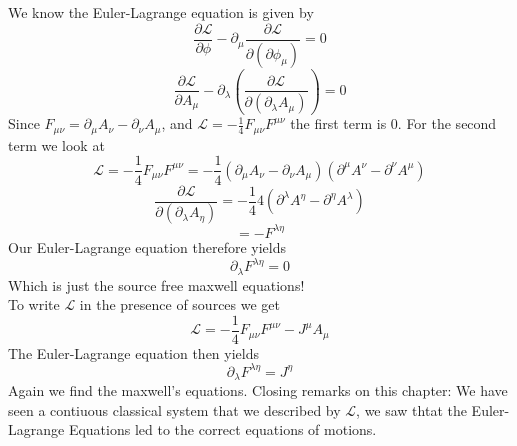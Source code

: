 \documentclass{report}
\begin{document}
We know the Euler-Lagrange equation is given by \[
	\frac{\partial \mathcal{L}}{\partial \phi } - \partial_\mu \frac{\partial \mathcal{L}}{\partial \left( \partial\phi_\mu  \right) } =0
\] \[
\frac{\partial \mathcal{L}}{\partial A_\mu} - \partial_\lambda \left( \frac{\partial \mathcal{L}}{\partial \left( \partial_\lambda A_\mu  \right) }   \right)   =0
\] Since $F_{\mu \nu} = \partial_\mu A_\nu - \partial_\nu A_\mu$, and $\mathcal{L} = -\frac{1}{4} F_{\mu \nu} F^{\mu \nu}$ the first term is $0$. For the second term we look at \[
\mathcal{L} = -\frac{1}{4} F_{\mu \nu} F^{\mu \nu} = -\frac{1}{4} \left( \partial_\mu A_\nu - \partial_\nu A_\mu   \right) \left( \partial^\mu A^\nu - \partial^\nu A^\mu    \right) 
\] \[
\frac{\partial \mathcal{L}}{\partial \left( \partial_\lambda A_\eta  \right) }  = -\frac{1}{4} 4 \left( \partial^\lambda A^\eta - \partial^\eta A^\lambda  \right)
\] \[
= - F^{\lambda \eta}
\] Our Euler-Lagrange equation therefore yields \[
\partial_\lambda F^{\lambda \eta} = 0 
\] Which is just the source free maxwell equations! \\
To write $\mathcal{L}$ in the presence of sources we get \[
	\mathcal{L} = -\frac{1}{4} F_{\mu \nu} F^{\mu \nu} - J^\mu A_\mu
\] The Euler-Lagrange equation then yields \[
\partial_\lambda F^{\lambda \eta} = J^\eta 
\] Again we find the maxwell's equations.
Closing remarks on this chapter: We have seen a contiuous classical system that we described by $\mathcal{L}$, we saw thtat the Euler-Lagrange Equations led to the correct equations of motions.
\end{document}
